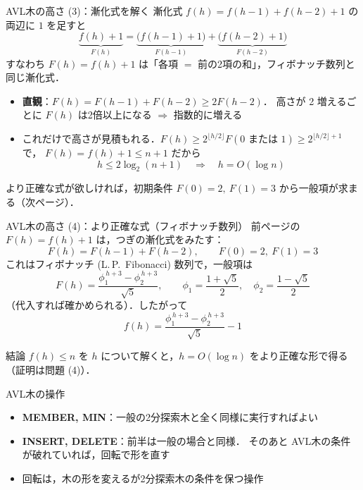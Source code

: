 \documentclass[aspectratio=169,11pt]{beamer}
\begin{document}
\begin{frame}{AVL木の高さ (3)：漸化式を解く}
  漸化式 $f(h)=f(h-1)+f(h-2)+1$ の両辺に $1$ を足すと
  \[
    \underbrace{f(h)+1}_{F(h)} = \underbrace{\bigl(f(h-1)+1\bigr)}_{F(h-1)}
      + \underbrace{\bigl(f(h-2)+1\bigr)}_{F(h-2)}
  \]
  すなわち $F(h)=f(h)+1$ は「各項 $=$ 前の2項の和」，\alert{フィボナッチ数列}と同じ漸化式．
  \begin{itemize}
    \item \textbf{直観}：$F(h)=F(h-1)+F(h-2)\ge 2F(h-2)$．
          高さが 2 増えるごとに $F(h)$ は\alert{2倍以上}になる $\Rightarrow$ 指数的に増える
    \item これだけで高さが見積もれる．$F(h)\ge 2^{\lfloor h/2\rfloor}F(0\text{ または }1)\ge 2^{\lfloor h/2\rfloor+1}$ で，
          $F(h)=f(h)+1\le n+1$ だから
          \[ h\le 2\log_2(n+1)\quad\Rightarrow\quad h=O(\log n) \]
  \end{itemize}
  より正確な式が欲しければ，初期条件 $F(0)=2,\ F(1)=3$ から一般項が求まる（次ページ）．
\end{frame}

\begin{frame}{AVL木の高さ (4)：より正確な式（フィボナッチ数列）}
  前ページの $F(h)=f(h)+1$ は，つぎの漸化式をみたす：
  \[
    F(h) = F(h-1) + F(h-2),\qquad F(0)=2,\ F(1)=3
  \]
  これはフィボナッチ (L.\,P.~Fibonacci) 数列で，一般項は
  \[
    F(h) = \frac{\phi_1^{\,h+3}-\phi_2^{\,h+3}}{\sqrt5},\qquad
    \phi_1 = \frac{1+\sqrt5}{2},\quad \phi_2 = \frac{1-\sqrt5}{2}
  \]
  （代入すれば確かめられる）．したがって
  \[
    f(h) = \frac{\phi_1^{\,h+3}-\phi_2^{\,h+3}}{\sqrt5} - 1 \tag{3.2}
  \]
  \begin{alertblock}{結論}
    $f(h) \le n$ を $h$ について解くと，$h = O(\log n)$ をより正確な形で得る（証明は問題 (4)）．
  \end{alertblock}
\end{frame}

\begin{frame}{AVL木の操作}
  \begin{itemize}
    \item \textbf{MEMBER, MIN}：一般の2分探索木と全く同様に実行すればよい
    \item \textbf{INSERT, DELETE}：前半は一般の場合と同様．
          そのあと AVL木の条件が破れていれば，\alert{回転}で形を直す
    \item 回転は，木の形を変えるが\alert{2分探索木の条件を保つ}操作
  \end{itemize}
\end{frame}
\end{document}
